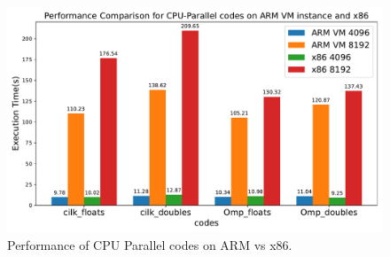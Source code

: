\begin{figure}[htbp]
  \centering
  \includegraphics[width=1.0\linewidth]{Images/ARMvsx86.pdf}
  \caption{Performance of CPU Parallel codes on ARM vs x86.}
  \label{fig:armvsx86}
\end{figure}